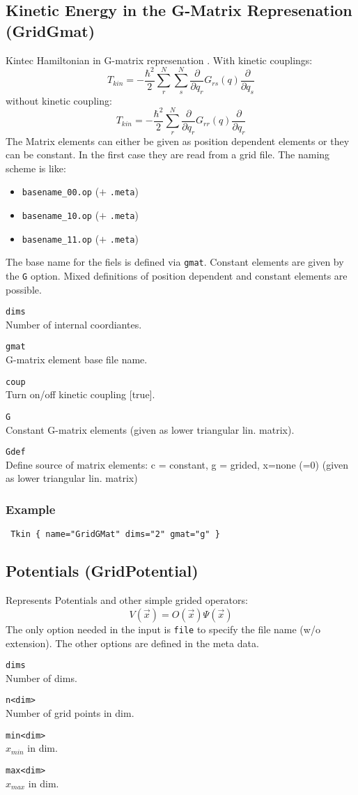 \documentclass[a4paper,12pt]{scrbook}
\newcommand{\option}[2]{\item \texttt{#1}\\ #2}
\begin{document}
\subsection{Kinetic Energy in the G-Matrix Represenation (GridGmat)}
Kintec Hamiltonian in G-matrix represenation \cite{Stare03}. With kinetic
couplings:
\begin{equation}
 T_{kin} = -\frac{\hbar^2}{2} \sum_r^N \sum_s^N \frac{\partial}{\partial q_r} G_{rs}(q) \frac{\partial}{\partial q_s}
\end{equation}
without kinetic coupling:
\begin{equation}
 T_{kin} = -\frac{\hbar^2}{2} \sum_r^N \frac{\partial}{\partial q_r} G_{rr}(q) \frac{\partial}{\partial q_r}
\end{equation}
The Matrix elements can either be given as position dependent elements or they can be constant.
In the first case they are read from a grid file. The naming scheme is like:
\begin{itemize}
 \item \verb|basename_00.op| ($+$ \verb|.meta|)
 \item \verb|basename_10.op| ($+$ \verb|.meta|)
 \item \verb|basename_11.op| ($+$ \verb|.meta|)
\end{itemize}
The base name for the fiels is defined via \verb|gmat|. Constant elements are given by the \verb|G| option.
Mixed definitions of position dependent and constant elements are possible.

\begin{options}
\option{dims}{Number of internal coordiantes.}
\option{gmat}{G-matrix element base file name.}
\option{coup}{Turn on/off kinetic coupling [true].}
\option{G}{Constant G-matrix elements (given as lower triangular lin. matrix).}
\option{Gdef}{Define source of matrix elements: c = constant, g = grided, x=none (=0) (given as lower triangular lin. matrix)}
\end{options}

\subsubsection*{Example}
\begin{verbatim}
 Tkin { name="GridGMat" dims="2" gmat="g" }
\end{verbatim}

\subsection{Potentials (GridPotential)}
Represents Potentials and other simple grided operators:
\begin{equation}
 V(\vec{x}) = \hat O(\vec{x}) \Psi(\vec{x})
\end{equation}
The only option needed in the input is \verb|file| to specify the file name (w/o extension).
The other options are defined in the meta data.
\begin{options}
 \option{dims}{Number of dims.}
 \option{n<dim>}{Number of grid points in dim.}
 \option{min<dim>}{$x_{min}$ in dim.}
 \option{max<dim>}{$x_{max}$ in dim.}
\end{options}
\end{document}
